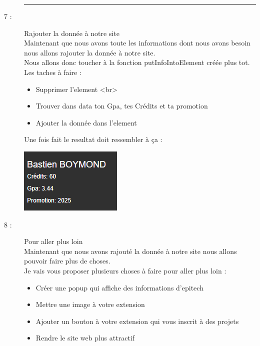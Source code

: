 \documentclass{article}
\begin{document}
\begin{description}
        \begin{center}
            \rule{0.75\linewidth}{1pt}
        \end{center}
        \item[7 :]{Rajouter la donnée à notre site} \\ Maintenant que nous avons toute les informations dont nous avons besoin nous allons rajouter la donnée à notre site.
        \\ Nous allons donc toucher à la fonction putInfoIntoElement créée plus tot.
        \\ Les taches à faire :
        \begin{itemize}
            \item Supprimer l'element <br>
            \item Trouver dans data ton Gpa, tes Crédits et ta promotion
            \item Ajouter la donnée dans l'element
        \end{itemize}
        Une fois fait le resultat doit ressembler à ça :
        \begin{center}
            \includegraphics[scale=0.8]{final.PNG}
        \end{center}
        \item[8 :]{Pour aller plus loin} \\ Maintenant que nous avons rajouté la donnée à notre site nous allons pouvoir faire plus de choses.
        \\ Je vais vous proposer plusieurs choses à faire pour aller plus loin :
        \begin{itemize}
            \item Créer une popup qui affiche des informations d'epitech
            \item Mettre une image à votre extension
            \item Ajouter un bouton à votre extension qui vous inscrit à des projets
            \item Rendre le site web plus attractif
        \end{itemize}
    \end{description}
\end{document}
